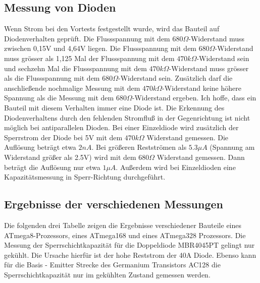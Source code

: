 \subsection{Messung von Dioden}
\label{sec:diode}
Wenn Strom bei den Vortests festgestellt wurde, wird das Bauteil auf Diodenverhalten geprüft.
Die Flussspannung mit dem \(680\Omega\)-Widerstand muss zwischen 0,15V und 4,64V liegen.
Die Flussspannung mit dem \(680\Omega\)-Widerstand muss grösser als 1,125 Mal der Flussspannung mit dem
 \(470k\Omega\)-Widerstand sein und sechzehn Mal die Flussspannung mit dem \(470k\Omega\)-Widerstand muss
grösser als die Flussspannung mit dem \(680\Omega\)-Widerstand sein.
Zusätzlich darf die anschließende nochmalige Messung mit dem \(470k\Omega\)-Widerstand  keine höhere Spannung als die
Messung mit dem \(680\Omega\)-Widerstand ergeben.
Ich hoffe, dass ein Bauteil mit diesem Verhalten immer eine Diode ist.
Die Erkennung des Diodenverhaltens durch den fehlenden Stromfluß in der Gegenrichtung ist nicht
möglich bei antiparallelen Dioden.
Bei einer Einzeldiode wird zusätzlich der Sperrstrom der Diode bei 5V mit dem \(470k\Omega\) Widerstand
gemessen. Die Auflösung beträgt etwa \(2nA\).
Bei größeren Restströmen als \(5.3\mu A\) (Spannung am Widerstand größer als 2.5V) wird
 mit dem \(680\Omega\) Widerstand gemessen.
Dann beträgt die Auflösung nur etwa \(1\mu A\).
Außerdem wird bei Einzeldioden eine Kapazitätsmessung in Sperr-Richtung durchgeführt. 

\subsection{Ergebnisse der verschiedenen Messungen}
Die folgenden drei Tabelle zeigen die Ergebnisse verschiedener Bauteile 
eines ATmega8-Prozessors, eines ATmega168 und eines ATmega328 Prozessors.
Die Messung der Sperrschichtkapazität für die Doppeldiode MBR4045PT gelingt
nur gekühlt. Die Ursache hierfür ist der hohe Reststrom der 40A Diode. Ebenso kann für die Basis - Emitter
Strecke des Germanium Transistors AC128 die Sperrschichtkapazität nur im
gekühlten Zustand gemessen werden. 

